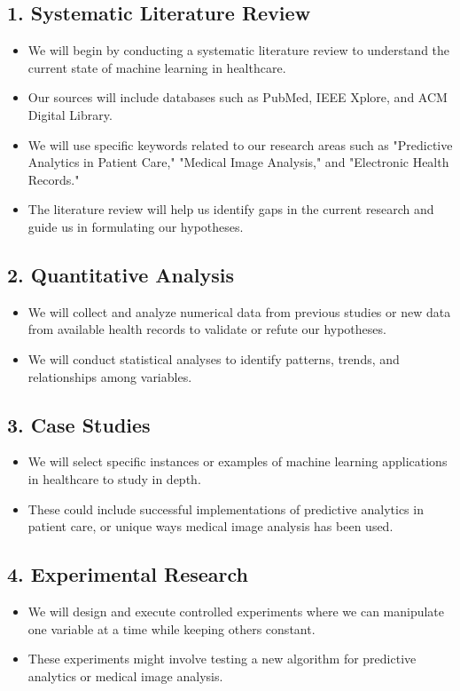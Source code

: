 \documentclass[conference]{IEEEtran}
\begin{document}
\subsection{1. Systematic Literature Review}
\begin{itemize}
\item We will begin by conducting a systematic literature review to understand the current state of machine learning in healthcare.
\item Our sources will include databases such as PubMed, IEEE Xplore, and ACM Digital Library.
\item We will use specific keywords related to our research areas such as "Predictive Analytics in Patient Care," "Medical Image Analysis," and "Electronic Health Records."
\item The literature review will help us identify gaps in the current research and guide us in formulating our hypotheses.
\end{itemize}
\subsection{2. Quantitative Analysis}
\begin{itemize}
\item We will collect and analyze numerical data from previous studies or new data from available health records to validate or refute our hypotheses.
\item We will conduct statistical analyses to identify patterns, trends, and relationships among variables.
\end{itemize}
\subsection{3. Case Studies}
\begin{itemize}
\item We will select specific instances or examples of machine learning applications in healthcare to study in depth.
\item These could include successful implementations of predictive analytics in patient care, or unique ways medical image analysis has been used.
\end{itemize}
\subsection{4. Experimental Research}
\begin{itemize}
\item We will design and execute controlled experiments where we can manipulate one variable at a time while keeping others constant.
\item These experiments might involve testing a new algorithm for predictive analytics or medical image analysis.
\end{itemize}
\end{document}
